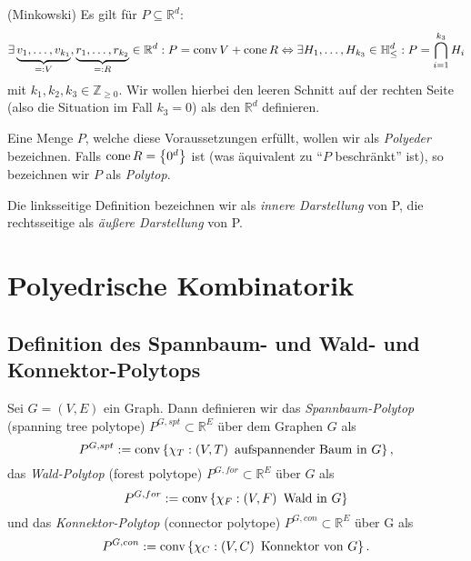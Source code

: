 \documentclass[10p,a4paper,BCOR = 12mm, DIV=15]{scrbook}
\begin{document}
\begin{Sa} (Minkowski)
Es gilt für $P \subseteq \mathbb{R}^d$:
\begin{displaymath}
\exists \underbrace{v_1, \ldots, v_{k_1}}_{=: V}, \underbrace{r_1, \ldots, r_{k_2}}_{=: R} \in \mathbb{R}^d: P = \operatorname{conv} V + \operatorname{cone} R \Leftrightarrow \exists H_1, \ldots, H_{k_3} \in \mathbb{H}_{\leq}^d: P = \bigcap_{i=1}^{k_3} H_i
\end{displaymath}
mit $k_1, k_2, k_3 \in \mathbb{Z}_{\geq 0}$. Wir wollen hierbei den leeren Schnitt auf der rechten Seite (also die Situation im Fall $k_3 = 0$) als den $\mathbb{R}^d$ definieren.

Eine Menge $P$, welche diese Voraussetzungen erfüllt, wollen wir als \emph{Polyeder} bezeichnen. Falls $\operatorname{cone} R = \left\{0^d\right\}$ ist (was äquivalent zu "`$P$ beschränkt"' ist), so bezeichnen wir $P$ als \emph{Polytop}.

Die linksseitige Definition bezeichnen wir als \emph{innere Darstellung} von P, die rechtsseitige als \emph{äußere Darstellung} von P.
\end{Sa}

\chapter{Polyedrische Kombinatorik}

\section{Definition des Spannbaum- und Wald- und Konnektor-Polytops}

\begin{Def}
Sei $G=\left(V, E\right)$ ein Graph. Dann definieren wir das \emph{Spannbaum-Polytop} (spanning tree polytope) $P^{G, spt} \subset \mathbb{R}^E$ über dem Graphen $G$ als
\begin{displaymath}
P^{G, spt} := \operatorname{conv} \left\{\chi_T: \left(V, T\right) \textnormal{ aufspannender Baum in } G\right\},
\end{displaymath}
das \emph{Wald-Polytop} (forest polytope) $P^{G, for} \subset \mathbb{R}^E$ über $G$ als
\begin{displaymath}
P^{G, for} := \operatorname{conv} \left\{\chi_F: \left(V, F\right) \textnormal{ Wald in } G\right\}
\end{displaymath}
und das \emph{Konnektor-Polytop} (connector polytope) $P^{G, con} \subset \mathbb{R}^E$ über G als
\begin{displaymath}
P^{G, con} := \operatorname{conv} \left\{\chi_C: \left(V, C\right) \textnormal{ Konnektor von } G\right\}.
\end{displaymath}
\end{Def}
\end{document}

